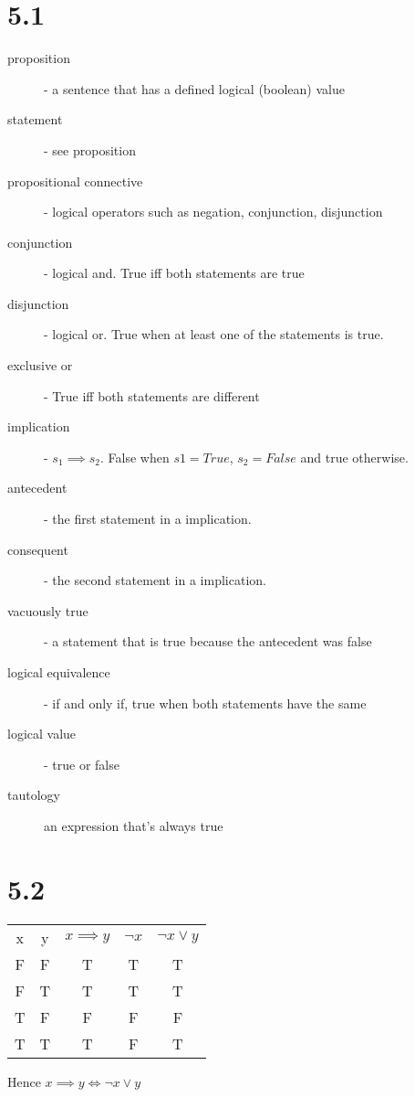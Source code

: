 \documentclass{article}
\begin{document}
\section*{5.1}
\begin{description}
\item[proposition] - a sentence that has a defined logical (boolean) value
\item[statement] - see proposition
\item[propositional connective] - logical operators such as negation, conjunction, disjunction 
\item[conjunction] - logical and. True iff both statements are true
\item[disjunction] - logical or. True when at least one of the statements is true.
\item[exclusive or] - True iff both statements are different
\item[implication] - $s_1 \implies s_2$. False when $s1 = True$, $s_2 = False$ and true otherwise.
\item[antecedent] - the first statement in a implication.
\item[consequent] - the second statement in a implication.
\item[vacuously true] - a statement that is true because the antecedent was false
\item[logical equivalence] - if and only if, true when both statements have the same
\item[logical value] - true or false
\item[tautology] an expression that's always true
\end{description}

\section*{5.2}

\begin{tabular}{ c | c | c | c | c}
x  & y  & $x \implies y$ & $\neg x$ & $\neg x \lor y$ \\
F  & F  &   T    &   T   &       T      \\
F  & T  &   T    &   T   &       T      \\
T  & F  &   F    &   F   &       F      \\
T  & T  &   T    &   F   &       T      \\
\end{tabular}

Hence $x \implies y \iff \neg x \lor y$
\end{document}
